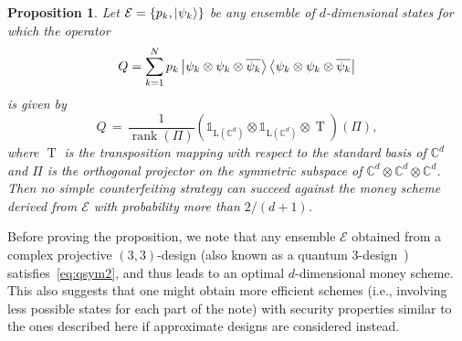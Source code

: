 \documentclass[11pt,letterpaper]{article}
\newtheorem{prop}[theorem]{Proposition}
\theoremstyle{definition}
\newcommand{\microspace}{\mspace{0.5mu}}
\newcommand{\op}[1]{\operatorname{#1}}
\def\I{\mathbb{1}}
\newcommand{\setft}[1]{\mathrm{#1}}
\newcommand{\lin}[1]{\setft{L}\left(#1\right)}
\def\complex{\mathbb{C}}
\def \lket {\left|}
\def \rket {\right\rangle}
\def \lbra {\left\langle}
\def \rbra {\right|}
\newcommand{\ket}[1]{\lket\microspace #1 \microspace\rket}
\newcommand{\bra}[1]{\lbra\microspace #1 \microspace\rbra}
\begin{document}
\begin{prop}\label{lem:opt-higher-dimensions}
Let $\mathcal{E}=\{p_k,\ket{\psi_k}\}$ be any ensemble of
$d$-dimensional states for which the operator
\[
Q = \sum_{k = 1}^N p_k
\ket{\psi_k \otimes \psi_k \otimes \overline{\psi_k}}
\bra{\psi_k \otimes \psi_k \otimes \overline{\psi_k}}
\]
is given by
\begin{equation}
Q \,=\, 
\frac{1}{\op{rank}(\Pi)}
\left(\I_{\lin{\complex^d}}\otimes\I_{\lin{\complex^d}}\otimes
\op{T}\right)(\Pi),\label{eq:qsym2}
\end{equation}
where $\op{T}$ is the transposition mapping with respect to the
standard basis of $\complex^d$ and $\Pi$ is the orthogonal projector
on the symmetric subspace of 
$\complex^d \otimes \complex^d \otimes \complex^d$. 
Then no simple counterfeiting strategy can succeed
against the money scheme derived from $\mathcal{E}$ with probability
more than $2/(d+1)$.
\end{prop}

Before proving the proposition, we note that any ensemble $\mathcal{E}$
obtained from a complex projective $(3,3)$-design (also known as a
quantum $3$-design~\cite{AmbE07}) satisfies~\eqref{eq:qsym2}, and thus
leads to an optimal $d$-dimensional money scheme. This also suggests
that one might obtain more efficient schemes (i.e., involving less
possible states for each part of the note) with security properties
similar to the ones described here if approximate designs are
considered instead.
\end{document}
